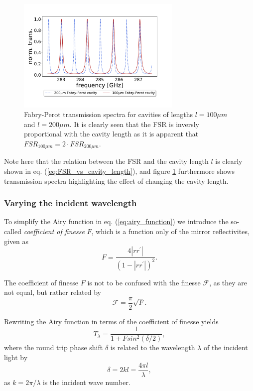 \begin{figure}[h!]
    \centering
    \includegraphics[width=0.7\textwidth]{figures/100um_and_200um_fabry_perot_trans_vs_freq.pdf}
    \caption{Fabry-Perot transmission spectra for cavities of lengths $l = 100 \mu m$ and $l = 200 \mu m$. It is clearly seen that the FSR is inversly proportional with the cavity length as it is apparent that $FSR_{100 \mu m} = 2 \cdot FSR_{200 \mu m}$.}
    \label{fig:fabry_perot_FSR_comparison}
\end{figure}


Note here that the relation between the FSR and the cavity length $l$ is clearly shown in eq. (\ref{eq:FSR_vs_cavity_length}), and figure \ref{fig:fabry_perot_FSR_comparison} furthermore shows transmission spectra highlighting the effect of changing the cavity length. 

\subsubsection{Varying the incident wavelength}

To simplify the Airy function in eq. (\ref{eq:airy_function}) we introduce the so-called \emph{coefficient of finesse} $F$, which is a function only of the mirror reflectivites, given as
\begin{equation}
    F = \frac{4 |rr^{\prime}|}{(1-|rr^{\prime}|)^2}.
\end{equation}

The coefficient of finesse $F$ is not to be confused with the finesse $\mathcal{F}$, as they are not equal, but rather related by
\begin{equation}
    \mathcal{F} = \frac{\pi}{2} \sqrt{F}.
\end{equation}

Rewriting the Airy function in terms of the coefficient of finesse yields
\begin{equation}
    T_{\lambda} = \frac{1}{1+ F sin^2 \left(\delta / 2\right)},
    \label{eq:simplified_airy_function}
\end{equation}
where the round trip phase shift $\delta$ is related to the wavelength $\lambda$ of the incident light by
\begin{equation}
    \delta = 2kl = \frac{4 \pi l }{\lambda},
\end{equation}
as $k = 2 \pi / \lambda$ is the incident wave number.

